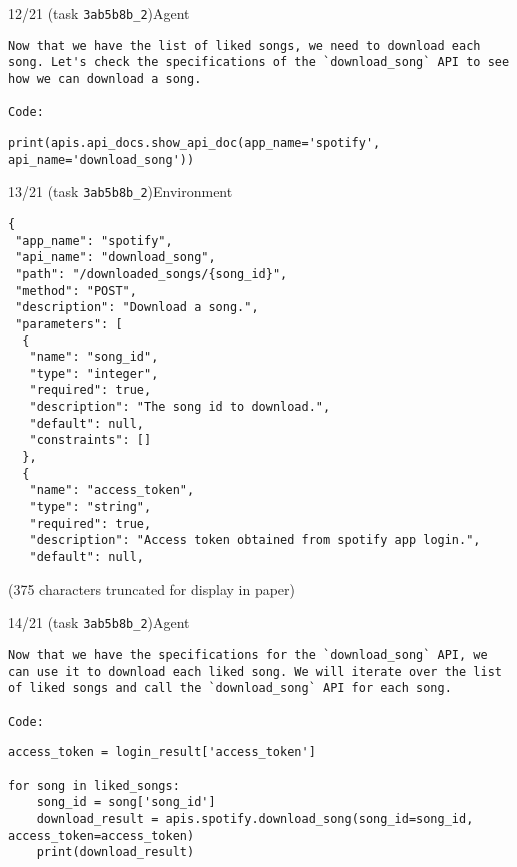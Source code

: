 \begin{minipage}{0.95\linewidth}
\begin{assistant_message_box}{{12/21 (task \texttt{3ab5b8b\_2})\hfill Agent}}
\scriptsize
\begin{Verbatim}[breaklines]
Now that we have the list of liked songs, we need to download each song. Let's check the specifications of the `download_song` API to see how we can download a song.

Code:
\end{Verbatim}
\begin{tcolorbox}[colback=codebgcolor,boxrule=0pt]\begin{Verbatim}[breaklines]
print(apis.api_docs.show_api_doc(app_name='spotify', api_name='download_song'))
\end{Verbatim}
\end{tcolorbox}\end{assistant_message_box}
\end{minipage}

\hspace*{8mm}%
\begin{minipage}{0.95\linewidth}
\begin{user_message_box}{{13/21 (task \texttt{3ab5b8b\_2})\hfill Environment}}
\scriptsize
\begin{Verbatim}[breaklines]
{
 "app_name": "spotify",
 "api_name": "download_song",
 "path": "/downloaded_songs/{song_id}",
 "method": "POST",
 "description": "Download a song.",
 "parameters": [
  {
   "name": "song_id",
   "type": "integer",
   "required": true,
   "description": "The song id to download.",
   "default": null,
   "constraints": []
  },
  {
   "name": "access_token",
   "type": "string",
   "required": true,
   "description": "Access token obtained from spotify app login.",
   "default": null,
\end{Verbatim}
(375 characters truncated for display in paper)\end{user_message_box}
\end{minipage}

\begin{minipage}{0.95\linewidth}
\begin{assistant_message_box}{{14/21 (task \texttt{3ab5b8b\_2})\hfill Agent}}
\scriptsize
\begin{Verbatim}[breaklines]
Now that we have the specifications for the `download_song` API, we can use it to download each liked song. We will iterate over the list of liked songs and call the `download_song` API for each song.

Code:
\end{Verbatim}
\begin{tcolorbox}[colback=codebgcolor,boxrule=0pt]\begin{Verbatim}[breaklines]
access_token = login_result['access_token']

for song in liked_songs:
    song_id = song['song_id']
    download_result = apis.spotify.download_song(song_id=song_id, access_token=access_token)
    print(download_result)
\end{Verbatim}
\end{tcolorbox}\end{assistant_message_box}
\end{minipage}

